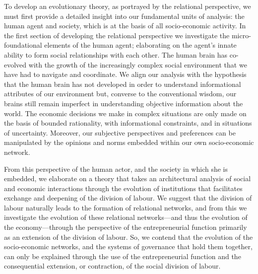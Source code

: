 
\medskip\noindent To develop an evolutionary theory, as portrayed by the relational perspective, we must first provide a detailed insight into our fundamental units of analysis: the human agent and society, which is at the basis of all socio-economic activity. In the first section of developing the relational perspective we investigate the micro-foundational elements of the human agent; elaborating on the agent's innate ability to form social relationships with each other. The human brain has co-evolved with the growth of the increasingly complex social environment that we have had to navigate and coordinate. We align our analysis with the hypothesis that the human brain has not developed in order to understand informational attributes of our environment but, converse to the conventional wisdom, our brains still remain imperfect in understanding objective information about the world. The economic decisions we make in complex situations are only made on the basis of bounded rationality, with informational constraints, and in situations of uncertainty. Moreover, our subjective perspectives and preferences can be manipulated by the opinions and norms embedded within our own socio-economic network.

From this perspective of the human actor, and the society in which she is embedded, we elaborate on a theory that takes an architectural analysis of social and economic interactions through the evolution of institutions that facilitates exchange and deepening of the division of labour. We suggest that the division of labour naturally leads to the formation of relational networks, and from this we investigate the evolution of these relational networks---and thus the evolution of the economy---through the perspective of the entrepreneurial function primarily as an extension of the division of labour. So, we contend that the evolution of the socio-economic networks, and the systems of governance that hold them together, can only be explained through the use of the entrepreneurial function and the consequential extension, or contraction, of the social division of labour.


